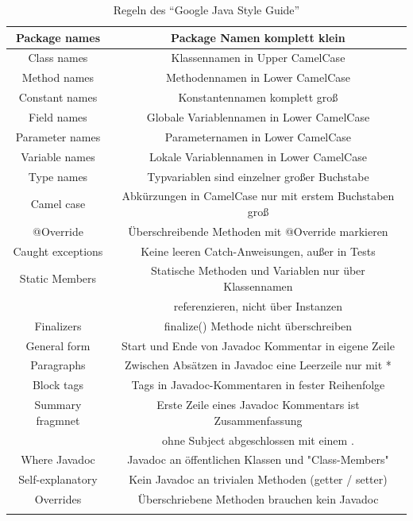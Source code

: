 \documentclass[da,ngerman]{stthesis}
\begin{document}
\begin{center}
\begin{longtabu}{|c|c|}
						Package names & Package Namen komplett klein \\
						\hline
						Class names & Klassennamen in Upper CamelCase \\
						\hline
						Method names & Methodennamen in Lower CamelCase \\
						\hline
						Constant names & Konstantennamen komplett groß \\
						\hline
						Field names & Globale Variablennamen in Lower CamelCase \\
						\hline
						Parameter names & Parameternamen in Lower CamelCase \\
						\hline
						Variable names & Lokale Variablennamen in Lower CamelCase \\
						\hline
						Type names & Typvariablen sind einzelner großer Buchstabe \\
						\hline
						Camel case & Abkürzungen in CamelCase nur mit erstem Buchstaben groß \\
						\hline
						@Override & Überschreibende Methoden mit @Override markieren \\
						\hline
						Caught exceptions & Keine leeren Catch-Anweisungen, außer in Tests \\
						\hline
						Static Members & Statische Methoden und Variablen nur über Klassennamen \\ & referenzieren, nicht über Instanzen \\
						\hline
						Finalizers & finalize() Methode nicht überschreiben \\
						\hline
						General form & Start und Ende von Javadoc Kommentar in eigene Zeile \\
						\hline
						Paragraphs & Zwischen Absätzen in Javadoc eine Leerzeile nur mit * \\
						\hline
						Block tags & Tags in Javadoc-Kommentaren in fester Reihenfolge \\
						\hline
						Summary fragmnet & Erste Zeile eines Javadoc Kommentars ist Zusammenfassung \\ & ohne Subject abgeschlossen mit einem . \\
						\hline
						Where Javadoc & Javadoc an öffentlichen Klassen und "Class-Members" \\
						\hline
						Self-explanatory & Kein Javadoc an trivialen Methoden (getter / setter) \\
						\hline
						Overrides & Überschriebene Methoden brauchen kein Javadoc \\
						\hline
  						\caption{Regeln des "`Google Java Style Guide"'  \cite{GoogleStyleGuide}}
						\label{googlerules}
  					\end{longtabu}   
  				\end{center}
\end{document}

